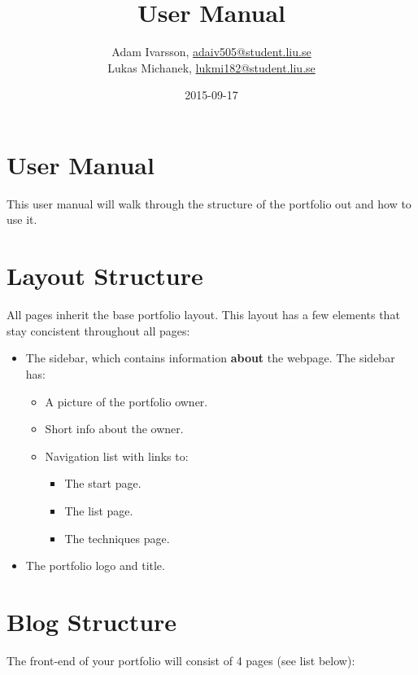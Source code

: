 \documentclass{TDP003mall}
\author{Adam Ivarsson, \url{adaiv505@student.liu.se}\\
  Lukas Michanek, \url{lukmi182@student.liu.se}}
\title{User Manual}
\date{2015-09-17}
\begin{document}
\projectpage


\section{User Manual}\label{user-manual}

This user manual will walk through the structure of the portfolio out and how to use it.


\section{Layout Structure}\label{layout-structure}

All pages inherit the base portfolio layout. This layout has a few elements that stay concistent throughout all pages:

\begin{itemize}
    \item The sidebar, which contains information \textbf{about} the webpage. The sidebar has:
    \begin{itemize}
        \item A picture of the portfolio owner.
        \item Short info about the owner.
        \item Navigation list with links to:
        \begin{itemize}
            \item The start page.
            \item The list page.
            \item The techniques page.
        \end{itemize}
    \end{itemize}
    \item The portfolio logo and title.
\end{itemize}


\section{Blog Structure}\label{blog-structure}

The front-end of your portfolio will consist of 4 pages (see list below):
\end{document}
